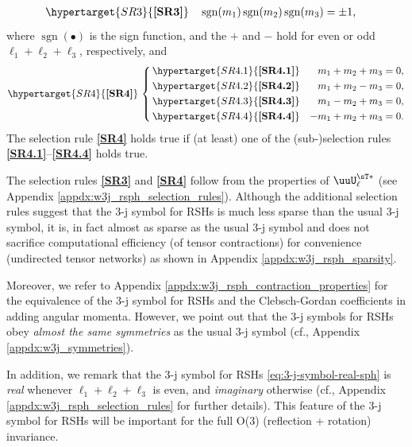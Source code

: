 \begin{align}\label{eq:SR3}
    \hypertarget{SR3}{\textbf{[SR3]}} & \quad \operatorname{sgn}(m_1)\operatorname{sgn}(m_2)\operatorname{sgn}(m_3) = \pm 1,
\end{align}
where $\operatorname{sgn}(\bullet)$ is the sign function, and the $+$ and $-$ hold for even or odd $\ell_1 + \ell_2 + \ell_3$, respectively, and
\begin{equation}\label{eq:SR4}
    \hypertarget{SR4}{\textbf{[SR4]}}
    \,\left\{
    \begin{aligned}
        \,\hypertarget{SR4.1}{\textbf{[SR4.1]}}
        && m_1 + m_2 + m_3 &= 0, \\
        \,\hypertarget{SR4.2}{\textbf{[SR4.2]}}
        && m_1 + m_2 - m_3 &= 0, \\
        \,\hypertarget{SR4.3}{\textbf{[SR4.3]}}
        && m_1 - m_2 + m_3 &= 0, \\
        \,\hypertarget{SR4.4}{\textbf{[SR4.4]}}
        && -m_1 + m_2 + m_3 &= 0.
    \end{aligned}
    \right.
\end{equation}
The selection rule \hyperlink{SR4}{\textbf{[SR4]}} holds true if (at least) one of the (sub-)selection rules \hyperlink{SR4.1}{\textbf{[SR4.1]}}--\hyperlink{SR4.4}{\textbf{[SR4.4]}} holds true.

The selection rules \hyperlink{SR3}{\textbf{[SR3]}} and \hyperlink{SR4}{\textbf{[SR4]}} follow from the properties of $\uuU_\ell^{\sT\ast}$ (see Appendix \ref{appdx:w3j_rsph_selection_rules}).
Although the additional selection rules suggest that the 3-j symbol for RSHs is much less sparse than the usual 3-j symbol, it is, in fact almost as sparse as the usual 3-j symbol and does not sacrifice computational efficiency (of tensor contractions) for convenience (undirected tensor networks) as shown in Appendix \ref{appdx:w3j_rsph_sparsity}.

Moreover, we refer to Appendix \ref{appdx:w3j_rsph_contraction_properties} for the equivalence of the 3-j symbol for RSHs and the Clebsch-Gordan coefficients in adding angular momenta.
However, we point out that the 3-j symbols for RSHs obey \emph{almost the same symmetries} as the usual 3-j symbol (cf., Appendix \ref{appdx:w3j_symmetries}).

In addition, we remark that the 3-j symbol for RSHs \eqref{eq:3-j-symbol-real-sph} is \emph{real} whenever $\ell_1 + \ell_2 + \ell_3$ is even, and \emph{imaginary} otherwise (cf., Appendix \ref{appdx:w3j_rsph_selection_rules} for further details).
This feature of the 3-j symbol for RSHs will be important for the full O(3) (reflection + rotation) invariance.

